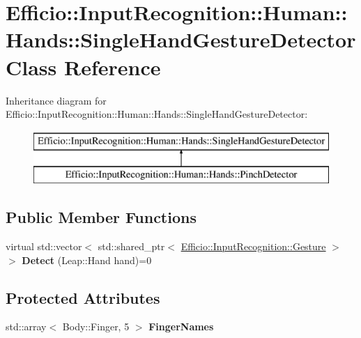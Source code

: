 \hypertarget{class_efficio_1_1_input_recognition_1_1_human_1_1_hands_1_1_single_hand_gesture_detector}{}\section{Efficio\+:\+:Input\+Recognition\+:\+:Human\+:\+:Hands\+:\+:Single\+Hand\+Gesture\+Detector Class Reference}
\label{class_efficio_1_1_input_recognition_1_1_human_1_1_hands_1_1_single_hand_gesture_detector}
Inheritance diagram for Efficio\+:\+:Input\+Recognition\+:\+:Human\+:\+:Hands\+:\+:Single\+Hand\+Gesture\+Detector\+:\begin{figure}[H]
\begin{center}
\leavevmode
\includegraphics[height=2.000000cm]{class_efficio_1_1_input_recognition_1_1_human_1_1_hands_1_1_single_hand_gesture_detector}
\end{center}
\end{figure}
\subsection*{Public Member Functions}
\begin{DoxyCompactItemize}
\item 
virtual std\+::vector$<$ std\+::shared\+\_\+ptr$<$ \hyperlink{class_efficio_1_1_input_recognition_1_1_gesture}{Efficio\+::\+Input\+Recognition\+::\+Gesture} $>$ $>$ {\bfseries Detect} (Leap\+::\+Hand hand)=0\hypertarget{class_efficio_1_1_input_recognition_1_1_human_1_1_hands_1_1_single_hand_gesture_detector_a6fb83b598c1f11539f6c49495c987994}{}\label{class_efficio_1_1_input_recognition_1_1_human_1_1_hands_1_1_single_hand_gesture_detector_a6fb83b598c1f11539f6c49495c987994}

\end{DoxyCompactItemize}
\subsection*{Protected Attributes}
\begin{DoxyCompactItemize}
\item 
std\+::array$<$ Body\+::\+Finger, 5 $>$ {\bfseries Finger\+Names}
\end{DoxyCompactItemize}


